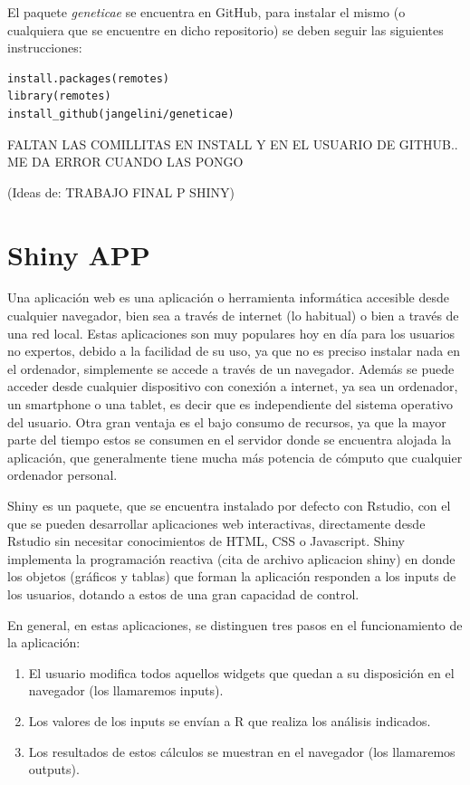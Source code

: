 El paquete \emph{geneticae} se encuentra en GitHub, para instalar el mismo (o cualquiera que se encuentre en dicho repositorio) se deben seguir las siguientes instrucciones:\\


\begin{lstlisting}[frame=single]
install.packages(remotes) 
library(remotes)
install_github(jangelini/geneticae) 
\end{lstlisting}


{\Huge{FALTAN LAS COMILLITAS EN INSTALL Y EN EL USUARIO DE GITHUB.. ME DA ERROR CUANDO LAS PONGO}}



{\Huge{(Ideas de: TRABAJO FINAL P SHINY)}}

\section{Shiny APP}
Una aplicación web es una aplicación o herramienta informática accesible desde cualquier navegador, bien sea a través de internet (lo habitual) o bien a través de una red local. 
Estas aplicaciones son muy populares hoy en día para los usuarios no expertos, debido a la facilidad de su uso, ya que no es preciso instalar nada en el ordenador, simplemente se accede a través de un navegador. Además se puede acceder desde cualquier dispositivo con conexión a internet, ya sea un ordenador, un smartphone o una tablet, es decir que es independiente del sistema operativo del usuario. Otra gran ventaja es el bajo consumo de recursos, ya que la mayor parte del tiempo estos se consumen en el servidor donde se encuentra alojada la aplicación, que generalmente tiene mucha más potencia de cómputo que cualquier ordenador personal.

Shiny es un paquete, que se encuentra instalado por defecto con Rstudio, con el que se pueden desarrollar aplicaciones web interactivas, directamente desde Rstudio sin necesitar conocimientos de HTML, CSS o Javascript. Shiny implementa la programación reactiva (cita de archivo aplicacion shiny) en donde los objetos (gráficos y tablas) que forman la aplicación responden a los inputs de los usuarios, dotando a estos de una gran capacidad de control.

En general, en estas aplicaciones, se distinguen tres pasos en el funcionamiento de la aplicación:
\begin{enumerate}
\item El usuario modifica todos aquellos widgets que quedan a su disposición en el navegador (los llamaremos inputs).
\item Los valores de los inputs se envían a R que realiza los análisis indicados.
\item Los resultados de estos cálculos se muestran en el navegador (los llamaremos outputs).
\end{enumerate}

